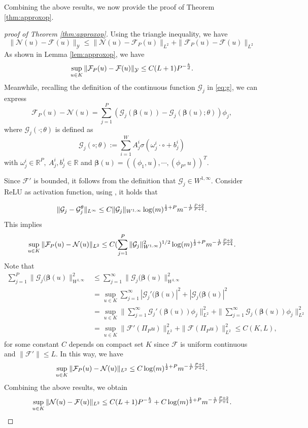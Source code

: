 \documentclass[preprint,12pt]{elsarticle}
\theoremstyle{plain}
\numberwithin{figure}{section}
\numberwithin{table}{section}
\begin{document}
Combining the above results, we now provide the proof of Theorem \ref{thm:approxop}.
\begin{proof}[proof of Theorem \ref{thm:approxop}]
	Using the triangle inequality, we have
	$$
	\|\mathcal{N}(u)-\mathcal{F}(u)\|_{\mathcal{Y}}\le \|\mathcal{N}(u)-\mathcal{F}_P(u)\|_{L^2} + \|\mathcal{F}_P(u)-\mathcal{F}(u)\|_{L^2}
	$$
	As shown in Lemma \ref{lem:approxop}, we have
	$$
	\sup_{u\in K}\|\mathcal{F}_P(u)-\mathcal{F}(u)\|_{\mathcal{Y}}\le C(L+1)P^{-{k\over d}}.
	$$
	Meanwhile, recalling the definition of the continuous function $\mathcal{G}_j$ in \eqref{eq:g},  we can express
	$$
	\mathcal{F}_P(u)-\mathcal{N}(u)= \sum_{j=1}^P (\mathcal{G}_j(\bm{\beta}(u))-\mathcal{G}_j(\bm{\beta}(u);\theta))\phi_j,
	$$
	where $\mathcal{G}_j(\cdot;\theta)$ is defined as
	$$\mathcal{G}_j(\circ;\theta):=\sum_{i=1}^W A_j^i\sigma(\omega_j^i\cdot\circ+b_j^i)$$ 
	with $\omega_j^i\in\mathbb{R}^P,~A_j^i,b_j^i\in \mathbb{R}$ and $\bm{\beta}(u)=((\phi_1,u),\cdots,(\phi_P,u))^T$. 
	
	Since $\mathcal{F}'$ is bounded, it follows from the definition that $\mathcal{G}_j\in W^{1,\infty}$. Consider ReLU as activation function, using \cite[Theorem 1]{mao2023rates}, it holds that
	
	$$
	\|\mathcal{G}_j-\mathcal{G}_j^\theta\|_{L^\infty} \le C\|\mathcal{G}_j\|_{W^{1,\infty}}\log(m)^{{1\over 2}+P}m^{-{1\over P}{P+2\over P+4}}.
	$$
	This implies
	$$
	\sup_{u\in K}\|\mathcal{F}_P(u)-\mathcal{N}(u)\|_{L^2} \le C(\sum_{j=1}^P\|\mathcal{G}_j\|_{W^{1,\infty}}^2)^{1/2}\log(m)^{{1\over 2}+P}m^{-{1\over P}{P+2\over P+4}}.
	$$
	Note that 
	$$
	\begin{aligned}
		\sum_{j=1}^P\|\mathcal{G}_j(\bm{\beta}(u)\|_{W^{1,\infty}}^2
		&\le \sum_{j=1}^\infty\|\mathcal{G}_j(\bm{\beta}(u)\|_{W^{1,\infty}}^2 \\
		& =\sup_{u\in K} \sum_{j=1}^\infty|\mathcal{G}_j'(\bm{\beta}(u)|^2+ |\mathcal{G}_j(\bm{\beta}(u)|^2\\
		& =\sup_{u\in K} \|\sum_{j=1}^\infty\mathcal{G}_j'(\bm{\beta}(u))\phi_j\|_{L^2}^2+ \|\sum_{j=1}^\infty\mathcal{G}_j(\bm{\beta}(u))\phi_j\|_{L^2}^2\\
		&=\sup_{u\in K} \|\mathcal{F}'(\Pi_Pu)\|_{L^2}^2 + \|\mathcal{F}(\Pi_Pu)\|_{L^2}^2 \le C(K,L),
	\end{aligned}
	$$
	for some constant $C$ depends on compact set $K$ since $\mathcal{F}$ 
	is uniform continuous and $\|\mathcal{F}'\|\le L$. In this way, we have
	$$
	\sup_{u\in K}\|\mathcal{F}_P(u)-\mathcal{N}(u)\|_{L^2} \le C\log(m)^{{1\over 2}+P}m^{-{1\over P}{P+2\over P+4}}.
	$$
	Combining the above results, we obtain
	$$
	\sup_{u \in K} \|\mathcal{N}(u) - \mathcal{F}(u)\|_{L^2} \leq C(L+1)P^{-{k\over d}}+C\log(m)^{{1\over 2}+P}m^{-{1\over P}{P+2\over P+4}}.
	$$
\end{proof}
\end{document}
